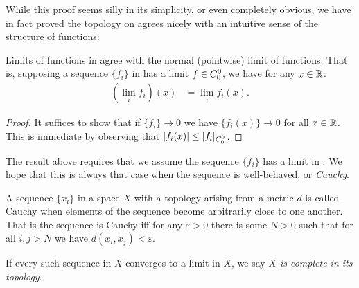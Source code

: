       While this proof seems silly in its simplicity, or even completely obvious, we have in fact proved the topology on \Coo agrees nicely with an intuitive sense of the structure of functions:
      \begin{cor}
        \label{cor:limitworks}
        Limits of functions in \Coo agree with the normal (pointwise) limit of functions.
        That is, supposing a sequence $\{f_i\}$ in \Coo has a limit $f\in{C^0_0}$, we have for any $x\in\mathbb{R}$:
        \begin{align*}
          (\lim_i f_i)(x) &= \lim_i f_i(x)\text{.}
        \end{align*}
      \end{cor}
      \begin{proof}
        It suffices to show that if $\{f_i\}\rightarrow 0$ we have $\{f_i(x)\}\rightarrow 0$ for all $x\in\mathbb{R}$.
        This is immediate by observing that $|f_i(x)|\le |f_i|_{C^0_0}$.
      \end{proof}

      The result above requires that we assume the sequence $\{f_i\}$ has a limit in \Coo.
      We hope that this is always that case when the sequence is well-behaved, or \emph{Cauchy}.
      \begin{defn}
        A sequence $\{x_i\}$ in a space $X$ with a topology arising from a metric $d$ is called Cauchy when elements of the sequence become arbitrarily close to one another.
        That is the sequence is Cauchy iff for any $\varepsilon>0$ there is some $N>0$ such that for all $i,j>N$ we have $d(x_i,x_j)<\varepsilon$.

        If every such sequence in $X$ converges to a limit in $X$, we say \emph{$X$ is complete in its topology}.
      \end{defn}

